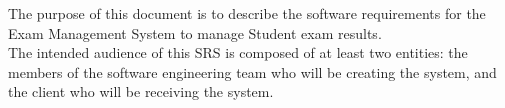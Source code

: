The purpose of this document is to describe the software requirements for the Exam Management System to manage Student exam results.
\\
The intended audience of this SRS is composed of at least two entities: the members of the software engineering team who will be creating the system, and the client who will be receiving the system.
